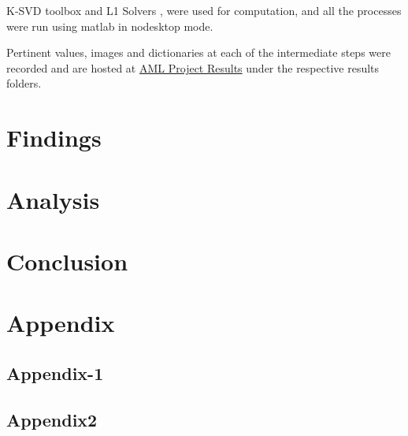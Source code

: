 \documentclass{article} %
\begin{document}
K-SVD toolbox \citep{rubinstein2008efficient} and L1 Solvers \citep{yang2010fast}, \citep{lee2007efficient} were used for computation, and all the processes were run using matlab in nodesktop mode.

Pertinent values, images and dictionaries at each of the intermediate steps were recorded and are hosted at \href{https://github.com/dkdfirefly/aml}{AML Project Results} under the respective results folders.

\vspace{.2cm}
\section{Findings}
\vspace{.2cm}

\section{Analysis}

\section{Conclusion}


\nocite{*}



\newpage
\section{Appendix}


\subsection{Appendix-1}
\label{sec:Appendix1}
 

\subsection{Appendix2}
\label{Appendix2}
\end{document}
